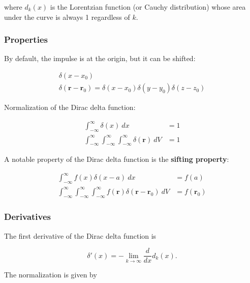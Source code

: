 where $d_k(x)$ is the Lorentzian function (or Cauchy distribution) whose area under the curve is always 1 regardless of $k$.

\subsubsection{Properties}

By default, the impulse is at the origin, but it can be shifted:

\begin{align*}
    \delta(x - x_0) \tag{1-dimensional} \\
    \delta(\mathbf{r} - \mathbf{r}_0) = \delta(x - x_0)\delta(y - y_0)\delta(z - z_0) \tag{3-dimensional}
\end{align*}

Normalization of the Dirac delta function:

\begin{align*}
    \int_{-\infty}^\infty \delta(x)~dx                                                      & = 1 \tag{1-dimensional} \\
    \int_{-\infty}^\infty \int_{-\infty}^\infty \int_{-\infty}^\infty \delta(\mathbf{r})~dV & = 1 \tag{3-dimensional}
\end{align*}

\vsp

A notable property of the Dirac delta function is the \textbf{sifting property}:

\begin{align*}
    \int_{-\infty}^\infty f(x)\delta(x-a)~dx                                                                          & = f(a) \tag{1-dimensional}            \\
    \int_{-\infty}^\infty \int_{-\infty}^\infty \int_{-\infty}^\infty f(\mathbf{r})\delta(\mathbf{r}-\mathbf{r}_0)~dV & = f(\mathbf{r}_0) \tag{3-dimensional}
\end{align*}

\subsubsection{Derivatives}

The first derivative of the Dirac delta function is

\begin{equation*}
    \delta'(x) = - \lim_{k \to \infty} \frac{d}{dx} d_k(x)\text{.}
\end{equation*}

The normalization is given by

